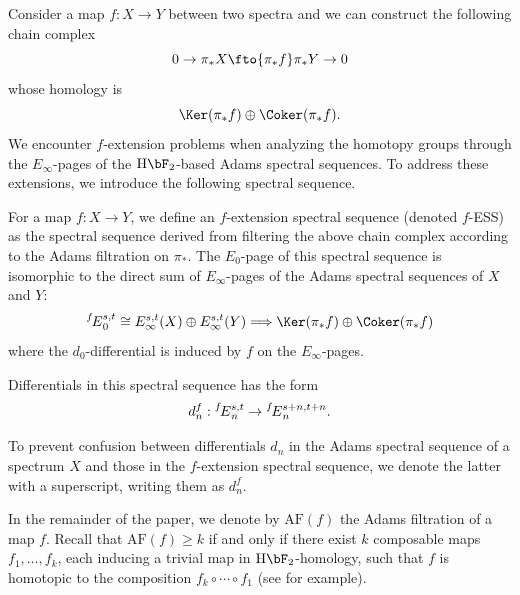 \documentclass{amsart}
\numberwithin{equation}{section}
\newcommand{\AF}{\mathrm{AF}}
\newcommand{\ESS}[1]{\prescript{#1\!}{}{E}}
\newcommand{\HF}{\mathrm{H}\bF_2}
\begin{document}
Consider a map $f: X\to Y$ between two spectra and we can construct the following chain complex
$$0\to \pi_*X\fto{\pi_*f} \pi_*Y\to 0$$
whose homology is 
$$\Ker(\pi_*f)\oplus \Coker(\pi_*f).$$
We encounter $f$-extension problems when analyzing the homotopy groups through the $E_\infty$-pages of the $\HF$-based Adams spectral sequences. To address these extensions, we introduce the following spectral sequence.



\begin{definition}\label{def:ess}
  For a map $f: X\to Y$, we define an $f$-extension spectral sequence (denoted $f$-ESS) as the spectral sequence derived from filtering the above chain complex according to the Adams filtration on $\pi_*$. The $E_0$-page of this spectral sequence is isomorphic to the direct sum of $E_\infty$-pages of the Adams spectral sequences of $X$ and $Y$: 
  $$\ESS{f}_0^{s,t} \cong E_\infty^{s,t}(X) \oplus E_\infty^{s,t}(Y) \Longrightarrow \Ker(\pi_*f)\oplus \Coker(\pi_*f)$$
  where the $d_0$-differential is induced by $f$ on the $E_\infty$-pages.
  
  Differentials in this spectral sequence has the form
  $$d_n^{f}: \ESS{f}_n^{s,t}\to \ESS{f}_n^{s+n, t+n}.$$
\end{definition}

To prevent confusion between differentials $d_n$ in the Adams spectral sequence of a spectrum $X$ and those in the $f$-extension spectral sequence, we denote the latter with a superscript, writing them as $d_n^{f}$. 

In the remainder of the paper, we denote by $\AF(f)$ the Adams filtration of a map $f$. Recall that $\AF(f) \ge k$ if and only if there exist $k$ composable maps $f_1, \ldots, f_k$, each inducing a trivial map in $\HF$-homology, such that $f$ is homotopic to the composition $f_k \circ \cdots \circ f_1$ (see \cite[Theorem~2.2.14]{RavenelGreenbook} for example).
\end{document}
